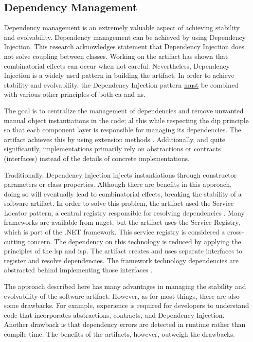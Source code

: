 \subsection{Dependency Management}

Dependency management is an extremely valuable aspect of achieving stability and
evolvability. Dependency management can be achieved by using Dependency Injection. This
research acknowledges \textcite[215]{mannaert_normalized_2016} statement that Dependency
Injection does not solve coupling between classes. Working on the artifact has shown that
combinatorial effects can occur when not careful. Nevertheless, Dependency Injection is a
widely used pattern in building the artifact. In order to achieve stability and
evolvability, the Dependency Injection pattern \underline{must} be combined with various
other principles of both \gls{ca} and \gls{ns}. 

The goal is to centralize the management of dependencies and remove unwanted manual object
instantiations in the code; al this while respecting the \gls{dip} principle so that each
component layer is responsible for managing its dependencies. The artifact achieves this
by using extension methods \parencite{koks_dependencyinjectionextension_2023}. Additionally, and quite significantly,
implementations primarily rely on abstractions or contracts (interfaces) instead of the
details of concrete implementations. 

Traditionally, Dependency Injection injects instantiations through constructor parameters
or class properties. Although there are benefits in this approach, doing so will
eventually lead to combinatorial effects, breaking the stability of a software artifact.
In order to solve this problem, the artifact used the Service Locator pattern, a central
registry responsible for resolving dependencies \parencite{wikipedia_service_2023}. Many 
frameworks are available from \gls{nuget}, but the artifact uses the Service Registry,
which is part of the .NET framework. This service registry is considered a cross-cutting
concern. The dependency on this technology is reduced by applying the principles of the
\gls{lsp} and \gls{isp}. The artifact creates and uses separate interfaces to register
\parencite{koks_idependencymanagerinteractor_2023} and resolve
\parencite{koks_idependencyfactoryinteractor_2023} dependencies. The framework technology
dependencies are abstracted behind implementing those interfaces
\parencite{koks_dependencymanagerinteractor_2023}. 

The approach described here has many advantages in managing the stability and evolvability
of the software artifact. However, as for most things, there are also some drawbacks. For
example, experience is required for developers to understand code that incorporates
abstractions, contracts, and Dependency Injection. Another drawback is that dependency
errors are detected in runtime rather than compile time. The benefits of the artifacts,
however, outweigh the drawbacks.